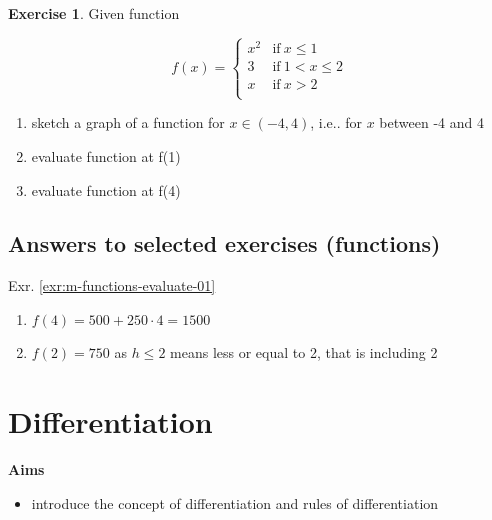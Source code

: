 \documentclass[
]{book}
\providecommand{\tightlist}{%
  \setlength{\itemsep}{0pt}\setlength{\parskip}{0pt}}
\theoremstyle{definition}
\theoremstyle{definition}
\theoremstyle{definition}
\newtheorem{exercise}{Exercise}[chapter]
\theoremstyle{remark}
\begin{document}
\begin{exercise}
\protect\hypertarget{exr:m-functions-plot-evaluate}{}{\label{exr:m-functions-plot-evaluate} }
Given function

\begin{equation}
    f(x) =
    \left\{
        \begin{array}{cc}
                x^2  & \mathrm{if\ } x \le 1 \\
                3  & \mathrm{if\ } 1 < x \le 2 \\
                x & \mathrm{if\ } x > 2 \\
        \end{array}
    \right.
\end{equation}

\begin{enumerate}
\def\labelenumi{\alph{enumi})}
\tightlist
\item
  sketch a graph of a function for \(x \in (-4, 4)\), i.e.. for \(x\) between -4 and 4
\item
  evaluate function at f(1)
\item
  evaluate function at f(4)
\end{enumerate}
\end{exercise}

\hypertarget{answers-to-selected-exercises-functions}{%
\section*{Answers to selected exercises (functions)}\label{answers-to-selected-exercises-functions}}

Exr. \ref{exr:m-functions-evaluate-01}

\begin{enumerate}
\def\labelenumi{\alph{enumi})}
\tightlist
\item
  \(f(4) = 500 + 250 \cdot 4 = 1500\)
\item
  \(f(2) = 750\) as \(h \le 2\) means less or equal to 2, that is including 2
\end{enumerate}

\hypertarget{differentiation}{%
\chapter{Differentiation}\label{differentiation}}

\textbf{Aims}

\begin{itemize}
\tightlist
\item
  introduce the concept of differentiation and rules of differentiation
\end{itemize}
\end{document}
